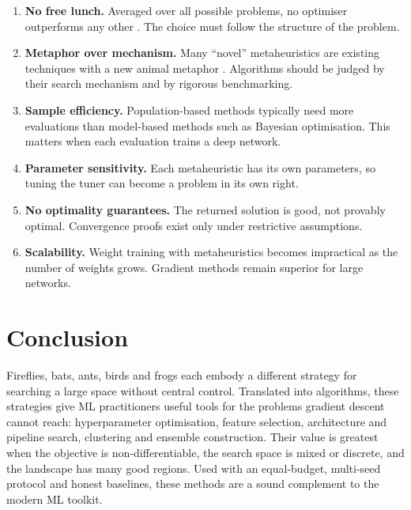 \documentclass[11pt,a4paper]{article}
\begin{document}
\begin{enumerate}
  \item \textbf{No free lunch.} Averaged over all possible problems, no optimiser outperforms any other \citep{wolpert1997}. The choice must follow the structure of the problem.
  \item \textbf{Metaphor over mechanism.} Many ``novel'' metaheuristics are existing techniques with a new animal metaphor \citep{sorensen2015}. Algorithms should be judged by their search mechanism and by rigorous benchmarking.
  \item \textbf{Sample efficiency.} Population-based methods typically need more evaluations than model-based methods such as Bayesian optimisation. This matters when each evaluation trains a deep network.
  \item \textbf{Parameter sensitivity.} Each metaheuristic has its own parameters, so tuning the tuner can become a problem in its own right.
  \item \textbf{No optimality guarantees.} The returned solution is good, not provably optimal. Convergence proofs exist only under restrictive assumptions.
  \item \textbf{Scalability.} Weight training with metaheuristics becomes impractical as the number of weights grows. Gradient methods remain superior for large networks.
\end{enumerate}

\section{Conclusion}
\label{sec:conclusion}

Fireflies, bats, ants, birds and frogs each embody a different strategy for searching a large space without central control. Translated into algorithms, these strategies give ML practitioners useful tools for the problems gradient descent cannot reach: hyperparameter optimisation, feature selection, architecture and pipeline search, clustering and ensemble construction. Their value is greatest when the objective is non-differentiable, the search space is mixed or discrete, and the landscape has many good regions. Used with an equal-budget, multi-seed protocol and honest baselines, these methods are a sound complement to the modern ML toolkit.
\end{document}
